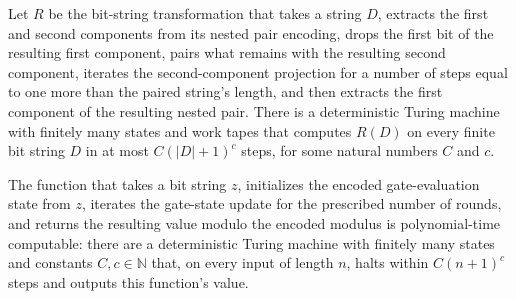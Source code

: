 \begin{theorem}
\label{Randomized.PIT.polyTimeComputable_runVal}
\leanok
{}
Let $R$ be the bit-string transformation that takes a string $D$, extracts the first and
second components from its nested pair encoding, drops the first bit of the resulting
first component, pairs what remains with the resulting second component, iterates the
second-component projection for a number of steps equal to one more than the paired
string’s length, and then extracts the first component of the resulting nested pair.
There is a deterministic Turing machine with finitely many states and work tapes that
computes $R(D)$ on every finite bit string $D$ in at most $C(|D|+1)^c$ steps, for some
natural numbers $C$ and $c$.
\end{theorem}

\begin{theorem}
\label{Randomized.PIT.polyTimeComputable_evalModW}
\leanok
{}
The function that takes a bit string $z$, initializes the encoded gate-evaluation state
from $z$, iterates the gate-state update for the prescribed number of rounds, and
returns the resulting value modulo the encoded modulus is polynomial-time computable:
there are a deterministic Turing machine with finitely many states and constants
$C,c\in\mathbb{N}$ that, on every input of length $n$, halts within $C(n+1)^c$ steps and
outputs this function's value.
\end{theorem}
